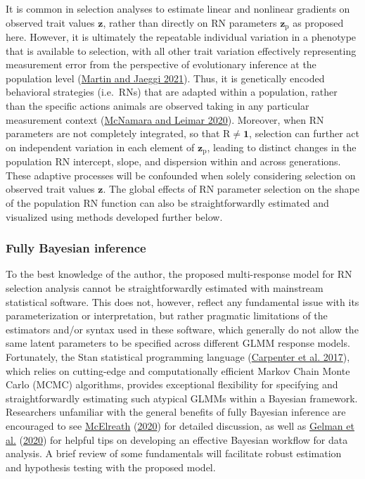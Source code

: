 \documentclass{article}
\begin{document}
It is common in selection analyses to estimate linear and nonlinear
gradients on observed trait values \(\boldsymbol{z}\), rather than
directly on RN parameters \(\boldsymbol{z}_{\boldsymbol{\mathrm{p}}}\)
as proposed here. However, it is ultimately the repeatable individual
variation in a phenotype that is available to selection, with all other
trait variation effectively representing measurement error from the
perspective of evolutionary inference at the population level
(\protect\hyperlink{ref-Martin2021}{Martin and Jaeggi 2021}). Thus, it
is genetically encoded behavioral strategies (i.e.~RNs) that are adapted
within a population, rather than the specific actions animals are
observed taking in any particular measurement context
(\protect\hyperlink{ref-McNamara2020}{McNamara and Leimar 2020}).
Moreover, when RN parameters are not completely integrated, so that
\(\boldsymbol{\mathrm{R}} \neq \boldsymbol{1}\), selection can further
act on independent variation in each element of
\(\boldsymbol{z}_{\boldsymbol{\mathrm{p}}}\), leading to distinct
changes in the population RN intercept, slope, and dispersion within and
across generations. These adaptive processes will be confounded when
solely considering selection on observed trait values
\(\boldsymbol{z}\). The global effects of RN parameter selection on the
shape of the population RN function can also be straightforwardly
estimated and visualized using methods developed further below.

\hypertarget{fully-bayesian-inference}{%
\subsubsection{Fully Bayesian
inference}\label{fully-bayesian-inference}}

To the best knowledge of the author, the proposed multi-response model
for RN selection analysis cannot be straightforwardly estimated with
mainstream statistical software. This does not, however, reflect any
fundamental issue with its parameterization or interpretation, but
rather pragmatic limitations of the estimators and/or syntax used in
these software, which generally do not allow the same latent parameters
to be specified across different GLMM response models. Fortunately, the
Stan statistical programming language
(\protect\hyperlink{ref-Stan}{Carpenter et al. 2017}), which relies on
cutting-edge and computationally efficient Markov Chain Monte Carlo
(MCMC) algorithms, provides exceptional flexibility for specifying and
straightforwardly estimating such atypical GLMMs within a Bayesian
framework. Researchers unfamiliar with the general benefits of fully
Bayesian inference are encouraged to see
\protect\hyperlink{ref-Rethinking}{McElreath}
(\protect\hyperlink{ref-Rethinking}{2020}) for detailed discussion, as
well as \protect\hyperlink{ref-Gelman2020}{Gelman et al.}
(\protect\hyperlink{ref-Gelman2020}{2020}) for helpful tips on
developing an effective Bayesian workflow for data analysis. A brief
review of some fundamentals will facilitate robust estimation and
hypothesis testing with the proposed model.
\end{document}
